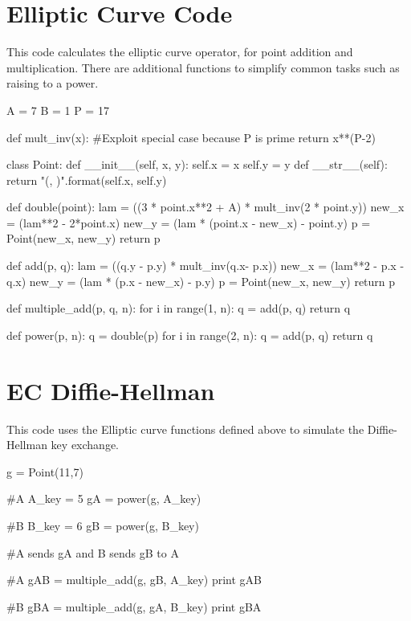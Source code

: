 \documentclass[11pt,a4paper,twoside]{article}
\begin{document}
\section{Elliptic Curve Code}
\label{ECC}
This code calculates the elliptic curve operator, for point addition and
multiplication. There are additional functions to simplify common tasks such as
raising to a power. 
\begin{python}
A = 7
B = 1
P = 17

def mult_inv(x):
    #Exploit special case because P is prime
    return x**(P-2) %

class Point:
    def __init__(self, x, y):
        self.x = x
        self.y = y
    def __str__(self):
        return "({}, {})".format(self.x, self.y)
    
def double(point):
    lam = ((3 * point.x**2 + A) * mult_inv(2 * point.y)) %
    new_x = (lam**2 - 2*point.x) %
    new_y = (lam * (point.x - new_x) - point.y) %
    p = Point(new_x, new_y)
    return p

def add(p, q):
    lam = ((q.y - p.y) * mult_inv(q.x- p.x)) %
    new_x = (lam**2 - p.x - q.x) %
    new_y = (lam * (p.x - new_x) - p.y) %
    p = Point(new_x, new_y)
    return p

def multiple_add(p, q, n):
    for i in range(1, n):
        q = add(p, q)
    return q

def power(p, n):
    q = double(p)
    for i in range(2, n):
        q = add(p, q)
    return q
\end{python}
\vfill
\pagebreak

\section{EC Diffie-Hellman}
\label{ECDH}
This code uses the Elliptic curve functions defined above to simulate the
Diffie-Hellman key exchange. 
\begin{python}
g = Point(11,7)

#A 
A_key = 5
gA = power(g, A_key)

#B 
B_key = 6
gB = power(g, B_key)

#A sends gA and B sends gB to A

#A 
gAB = multiple_add(g, gB, A_key)
print gAB

#B 
gBA = multiple_add(g, gA, B_key)
print gBA
\end{python}
\end{document}
